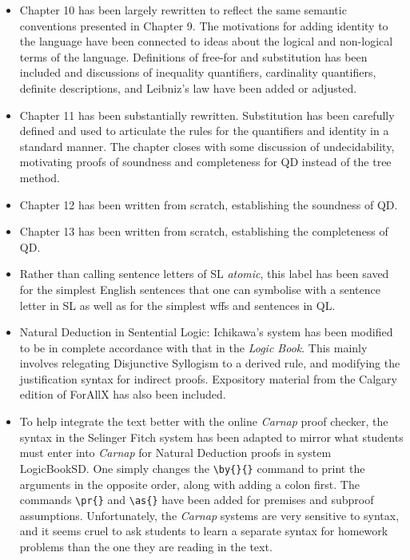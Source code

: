 \begin{itemize}
  \item Chapter 10 has been largely rewritten to reflect the same semantic conventions presented in Chapter 9. The motivations for adding identity to the language have been connected to ideas about the logical and non-logical terms of the language. Definitions of free-for and substitution has been included and discussions of inequality quantifiers, cardinality quantifiers, definite descriptions, and Leibniz's law have been added or adjusted.
  \item Chapter 11 has been substantially rewritten. Substitution has been carefully defined and used to articulate the rules for the quantifiers and identity in a standard manner. The chapter closes with some discussion of undecidability, motivating proofs of soundness and completeness for QD instead of the tree method.
  \item Chapter 12 has been written from scratch, establishing the soundness of QD.
  \item Chapter 13 has been written from scratch, establishing the completeness of QD.
  \item Rather than calling sentence letters of SL \textit{atomic}, this label has been saved for the simplest English sentences that one can symbolise with a sentence letter in SL as well as for the simplest wffs and sentences in QL.
  \item Natural Deduction in Sentential Logic: Ichikawa's system has been modified to be in complete accordance with that in the \textit{Logic Book}.
    This mainly involves relegating Disjunctive Syllogism to a derived rule, and modifying the justification syntax for indirect proofs.
    Expository material from the Calgary edition of ForAllX has also been included.
  \item To help integrate the text better with the online \textit{Carnap} proof checker, the syntax in the Selinger Fitch system has been adapted to mirror what students must enter into \textit{Carnap} for Natural Deduction proofs in system LogicBookSD.
    One simply changes the \verb|\by{}{}| command to print the arguments in the opposite order, along with adding a colon first.
    The commands \verb|\pr{}| and \verb|\as{}| have been added for premises and subproof assumptions.
    Unfortunately, the \textit{Carnap} systems are very sensitive to syntax, and it seems cruel to ask students to learn a separate syntax for homework problems than the one they are reading in the text. %

\end{itemize}
